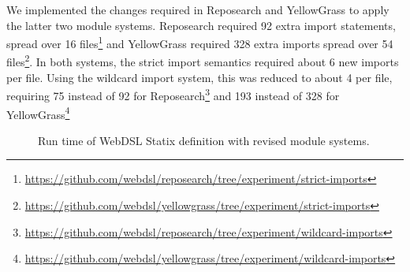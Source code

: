       We implemented the changes required in Reposearch and YellowGrass to apply the latter two module systems. Reposearch required 92 extra import statements, spread over 16 files\footnote{\url{https://github.com/webdsl/reposearch/tree/experiment/strict-imports}} and YellowGrass required 328 extra imports spread over 54 files\footnote{\url{https://github.com/webdsl/yellowgrass/tree/experiment/strict-imports}}. In both systems, the strict import semantics required about 6 new imports per file. Using the wildcard import system, this was reduced to about 4 per file, requiring 75 instead of 92 for Reposearch\footnote{\url{https://github.com/webdsl/reposearch/tree/experiment/wildcard-imports}} and 193 instead of 328 for YellowGrass\footnote{\url{https://github.com/webdsl/yellowgrass/tree/experiment/wildcard-imports}}

      \begin{figure}
        \parsingbenchmarkresults
        \caption{\label{fig:statix-performance-other-modules}Run time of WebDSL Statix definition with revised module systems.}
      \end{figure}

